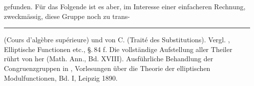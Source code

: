 gefunden. Für das Folgende ist es aber, im Interesse einer einfacheren Rechnung, zweckmässig, diese Gruppe noch zu trans-

\bigskip
\hrule
\bigskip

 (Cours d'alg\`ebre supérieure) und von C.  (Traité des Substitutions). Vergl. , Elliptische Functionen etc., \S.\,84 f. Die vollständige Aufstellung aller Theiler rührt von  her (Math. Ann., Bd. XVIII). Ausführliche Behandlung der Congruenzgruppen in \glqq {}, Vorlesungen über die Theorie der elliptischen Modulfunctionen\grqq{}, Bd. I, Leipzig 1890.
